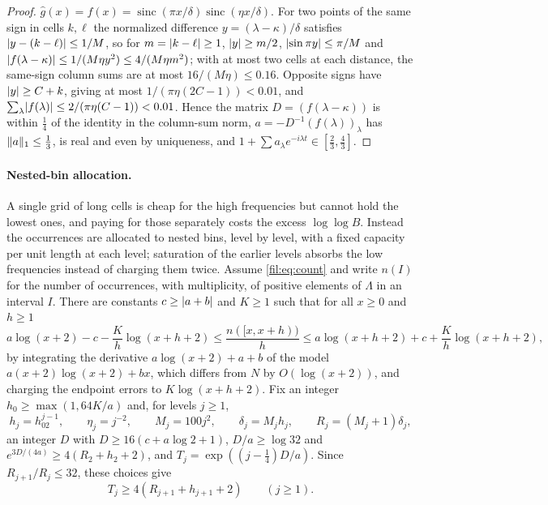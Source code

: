 \begin{proof}
$\widehat g(x)=f(x)=\operatorname{sinc}(\pi x/\delta)\operatorname{sinc}(\eta x/\delta)$. For two points of the same sign
in cells $k,\ell$ the normalized difference $y=(\lambda-\kappa)/\delta$ satisfies
$\lvert y-(k-\ell)\rvert\le1/M$, so for $m=\lvert k-\ell\rvert\ge1$, $\lvert y\rvert\ge m/2$, $\lvert\sin\pi y\rvert\le\pi/M$ and
$\lvert f(\lambda-\kappa)\rvert\le1/(M\eta y^2)\le4/(M\eta m^2)$; with at most two cells at each distance, the same-sign
column sums are at most $16/(M\eta)\le0.16$. Opposite signs have $\lvert y\rvert\ge C+k$, giving at most
$1/(\pi\eta(2C-1))<0.01$, and $\sum_\lambda\lvert f(\lambda)\rvert\le2/(\pi\eta(C-1))<0.01$. Hence the matrix
$D=(f(\lambda-\kappa))$ is within $\tfrac14$ of the identity in the column-sum norm, $a=-D^{-1}(f(\lambda))_\lambda$
has $\lVert a\rVert_1\le\tfrac13$, is real and even by uniqueness, and $1+\sum a_\lambda e^{-i\lambda t}\in[\tfrac23,\tfrac43]$.
\end{proof}

\paragraph{Nested-bin allocation.}
A single grid of long cells is cheap for the high frequencies but cannot hold the lowest ones, and paying
for those separately costs the excess $\log\log B$. Instead the occurrences are allocated to nested bins,
level by level, with a fixed capacity per unit length at each level; saturation of the earlier levels
absorbs the low frequencies instead of charging them twice. Assume \eqref{fil:eq:count} and write
$n(I)$ for the number of occurrences, with multiplicity, of positive elements of $\Lambda$ in an interval
$I$. There are constants $c\ge\lvert a+b\rvert$ and $K\ge1$ such that for all $x\ge0$ and $h\ge1$
\begin{equation}\label{fil:eq:bincount}
 a\log(x+2)-c-\frac Kh\log(x+h+2)\le\frac{n([x,x+h))}h\le a\log(x+h+2)+c+\frac Kh\log(x+h+2),
\end{equation}
by integrating the derivative $a\log(x+2)+a+b$ of the model $a(x+2)\log(x+2)+bx$, which differs from
$N$ by $O(\log(x+2))$, and charging the endpoint errors to $K\log(x+h+2)$. Fix an integer
$h_0\ge\max(1,64K/a)$ and, for levels $j\ge1$,
\[
 h_j=h_02^{j-1},\qquad \eta_j=j^{-2},\qquad M_j=100j^2,\qquad \delta_j=M_jh_j,\qquad R_j=(M_j+1)\delta_j ,
\]
an integer $D$ with $D\ge16(c+a\log2+1)$, $D/a\ge\log32$ and $e^{3D/(4a)}\ge4(R_2+h_2+2)$, and
$T_j=\exp((j-\tfrac14)D/a)$. Since $R_{j+1}/R_j\le32$, these choices give
\begin{equation}\label{fil:eq:Tlarge}
 T_j\ge4(R_{j+1}+h_{j+1}+2)\qquad(j\ge1).
\end{equation}

